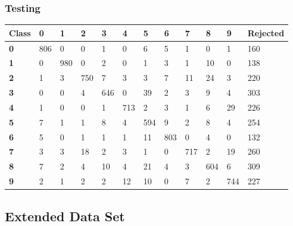 \documentclass[
  a4paper,            %
  DIV=10,             %
  oneside,            %
  BCOR=5mm,           %
  parskip=half,       %
  numbers=noenddot,   %
  bibtotoc,           %
  listof=totoc,        %
  article
]{scrreprt}
\begin{document}
\subsubsection{Testing}
\begin{center}
  \begin{tabular}{|p{1cm}|p{1cm}|p{1cm}|p{1cm}|p{1cm}|p{1cm}|p{1cm}|p{1cm}|p{1cm}|p{1cm}|p{1cm}|p{1.7cm}|}
    \hline
    \textbf{Class} & \textbf{0} & \textbf{1} & \textbf{2} & \textbf{3} & \textbf{4} & \textbf{5} & \textbf{6} & \textbf{7} & \textbf{8} & \textbf{9} & \textbf{Rejected} \\
    \hline
    \textbf{0} & 806 & 0 & 0 & 1 & 0 & 6 & 5 & 1 & 0 & 1 & 160 \\
    \hline
    \textbf{1} & 0 & 980 & 0 & 2 & 0 & 1 & 3 & 1 & 10 & 0 & 138 \\
    \hline
    \textbf{2} & 1 & 3 & 750 & 7 & 3 & 3 & 7 & 11 & 24 & 3 & 220 \\
    \hline
    \textbf{3} & 0 & 0 & 4 & 646 & 0 & 39 & 2 & 3 & 9 & 4 & 303 \\
    \hline
    \textbf{4} & 1 & 0 & 0 & 1 & 713 & 2 & 3 & 1 & 6 & 29 & 226 \\
    \hline
    \textbf{5} & 7 & 1 & 1 & 8 & 4 & 594 & 9 & 2 & 8 & 4 & 254 \\
    \hline
    \textbf{6} & 5 & 0 & 1 & 1 & 1 & 11 & 803 & 0 & 4 & 0 & 132 \\
    \hline
    \textbf{7} & 3 & 3 & 18 & 2 & 3 & 1 & 0 & 717 & 2 & 19 & 260 \\
    \hline
    \textbf{8} & 7 & 2 & 4 & 10 & 4 & 21 & 4 & 3 & 604 & 6 & 309 \\
    \hline
    \textbf{9} & 2 & 1 & 2 & 2 & 12 & 10 & 0 & 7 & 2 & 744 & 227 \\
    \hline
  \end{tabular}
\end{center}
\subsection{Extended Data Set}
\end{document}
